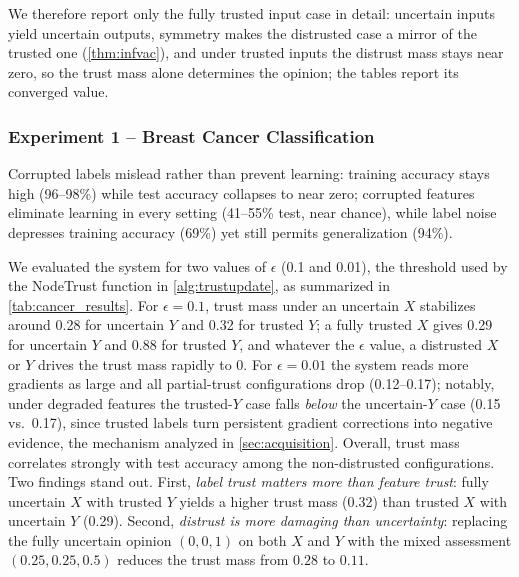 We therefore report only the fully trusted input case in detail: uncertain inputs yield uncertain outputs, symmetry makes the distrusted case a mirror of the trusted one (\cref{thm:infvac}), and under trusted inputs the distrust mass stays near zero, so the trust mass alone determines the opinion; the tables report its converged value.


\subsubsection*{Experiment 1 -- Breast Cancer Classification}
Corrupted labels mislead rather than prevent learning: training accuracy stays high (96--98\%) while test accuracy collapses to near zero; corrupted features eliminate learning in every setting (41--55\% test, near chance), while label noise depresses training accuracy (69\%) yet still permits generalization (94\%).

We evaluated the system for two values of $\epsilon$ (0.1 and 0.01), the threshold used by the NodeTrust function in \cref{alg:trustupdate}, as summarized in \cref{tab:cancer_results}. For $\epsilon = 0.1$, trust mass under an uncertain $X$ stabilizes around 0.28 for uncertain $Y$ and 0.32 for trusted $Y$; a fully trusted $X$ gives 0.29 for uncertain $Y$ and $0.88$ for trusted $Y$, and whatever the $\epsilon$ value, a distrusted $X$ or $Y$ drives the trust mass rapidly to 0. For $\epsilon = 0.01$ the system reads more gradients as large and all partial-trust configurations drop (0.12--0.17); notably, under degraded features the trusted-$Y$ case falls \emph{below} the uncertain-$Y$ case (0.15 vs.\ 0.17), since trusted labels turn persistent gradient corrections into negative evidence, the mechanism analyzed in \cref{sec:acquisition}.
Overall, trust mass correlates strongly with test accuracy among the non-distrusted configurations. Two findings stand out. First, \emph{label trust matters more than feature trust}: fully uncertain $X$ with trusted $Y$ yields a higher trust mass (0.32) than trusted $X$ with uncertain $Y$ (0.29). Second, \emph{distrust is more damaging than uncertainty}: replacing the fully uncertain opinion $(0,0,1)$ on both $X$ and $Y$ with the mixed assessment $(0.25,0.25,0.5)$ reduces the trust mass from $0.28$ to $0.11$.




